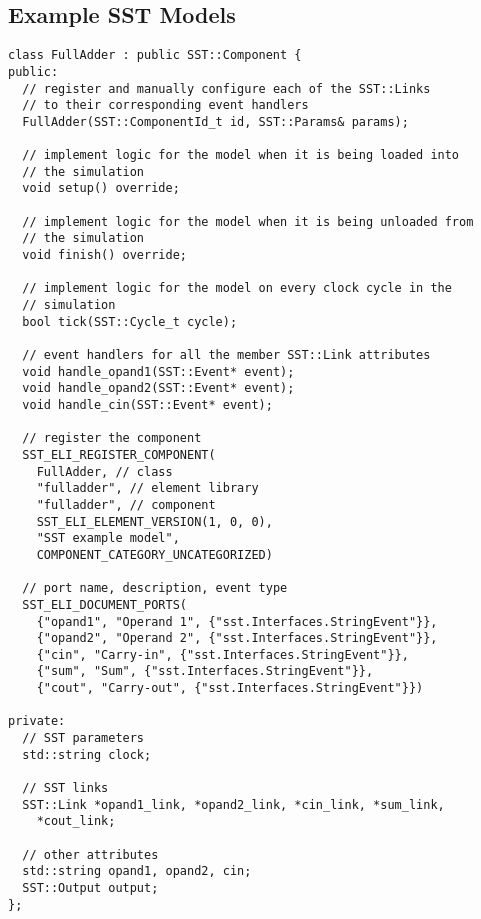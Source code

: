 \begin{appendices}
    \section{Example SST Models}
    \label{appendix:sstCode}

    \newpage
    \begin{lstlisting}[style=customC++,label=currentModel,caption=Example Interface of an SST Component Model]
class FullAdder : public SST::Component {
public:
  // register and manually configure each of the SST::Links
  // to their corresponding event handlers
  FullAdder(SST::ComponentId_t id, SST::Params& params);

  // implement logic for the model when it is being loaded into
  // the simulation
  void setup() override;

  // implement logic for the model when it is being unloaded from
  // the simulation
  void finish() override;

  // implement logic for the model on every clock cycle in the
  // simulation
  bool tick(SST::Cycle_t cycle);

  // event handlers for all the member SST::Link attributes
  void handle_opand1(SST::Event* event);
  void handle_opand2(SST::Event* event);
  void handle_cin(SST::Event* event);

  // register the component
  SST_ELI_REGISTER_COMPONENT(
    FullAdder, // class
    "fulladder", // element library
    "fulladder", // component
    SST_ELI_ELEMENT_VERSION(1, 0, 0),
    "SST example model",
    COMPONENT_CATEGORY_UNCATEGORIZED)

  // port name, description, event type
  SST_ELI_DOCUMENT_PORTS(
    {"opand1", "Operand 1", {"sst.Interfaces.StringEvent"}},
    {"opand2", "Operand 2", {"sst.Interfaces.StringEvent"}},
    {"cin", "Carry-in", {"sst.Interfaces.StringEvent"}},
    {"sum", "Sum", {"sst.Interfaces.StringEvent"}},
    {"cout", "Carry-out", {"sst.Interfaces.StringEvent"}})

private:
  // SST parameters
  std::string clock;

  // SST links
  SST::Link *opand1_link, *opand2_link, *cin_link, *sum_link,
    *cout_link;

  // other attributes
  std::string opand1, opand2, cin;
  SST::Output output;
};
\end{lstlisting}

\end{appendices}
